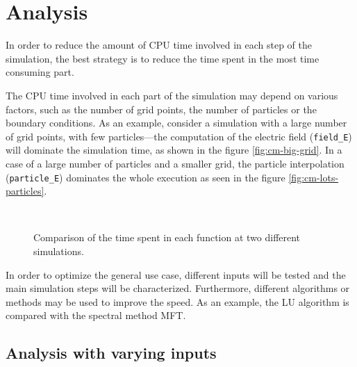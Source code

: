 \chapter{Analysis}



In order to reduce the amount of CPU time involved in each step of the 
simulation, the best strategy is to reduce the time spent in the most time 
consuming part.

The CPU time involved in each part of the simulation may depend on various 
factors, such as the number of grid points, the number of particles or the 
boundary conditions. As an example, consider a simulation with a large number of 
grid points, with few particles---the computation of the electric field 
(\texttt{field\_E}) will dominate the simulation time, as shown in the figure 
\ref{fig:cm-big-grid}. In a case of a large number of particles and a smaller 
grid, the particle interpolation (\texttt{particle\_E}) dominates the whole 
execution as seen in the figure \ref{fig:cm-lots-particles}.
%
\begin{figure}[h]
	\centering
	\\
	\caption{Comparison of the time spent in each function at two different 
	simulations.}
\end{figure}
%
In order to optimize the general use case, different inputs will be tested and 
the main simulation steps will be characterized. Furthermore, different 
algorithms or methods may be used to improve the speed. As an example, the LU 
algorithm is compared with the spectral method MFT.

\section{Analysis with varying inputs}
